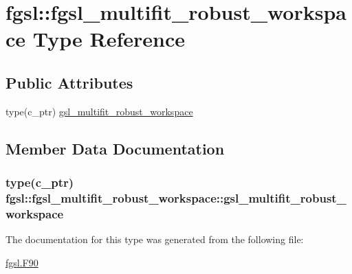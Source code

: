 \hypertarget{structfgsl_1_1fgsl__multifit__robust__workspace}{}\section{fgsl\+:\+:fgsl\+\_\+multifit\+\_\+robust\+\_\+workspace Type Reference}
\label{structfgsl_1_1fgsl__multifit__robust__workspace}
\subsection*{Public Attributes}
\begin{DoxyCompactItemize}
\item 
type(c\+\_\+ptr) \hyperlink{structfgsl_1_1fgsl__multifit__robust__workspace_ad3fb445413e5ff78b4f5a3fdabd3b984}{gsl\+\_\+multifit\+\_\+robust\+\_\+workspace}
\end{DoxyCompactItemize}


\subsection{Member Data Documentation}
\hypertarget{structfgsl_1_1fgsl__multifit__robust__workspace_ad3fb445413e5ff78b4f5a3fdabd3b984}{}
\subsubsection[{gsl\+\_\+multifit\+\_\+robust\+\_\+workspace}]{\setlength{\rightskip}{0pt plus 5cm}type(c\+\_\+ptr) fgsl\+::fgsl\+\_\+multifit\+\_\+robust\+\_\+workspace\+::gsl\+\_\+multifit\+\_\+robust\+\_\+workspace}\label{structfgsl_1_1fgsl__multifit__robust__workspace_ad3fb445413e5ff78b4f5a3fdabd3b984}


The documentation for this type was generated from the following file\+:\begin{DoxyCompactItemize}
\item 
\hyperlink{fgsl_8F90}{fgsl.\+F90}\end{DoxyCompactItemize}
